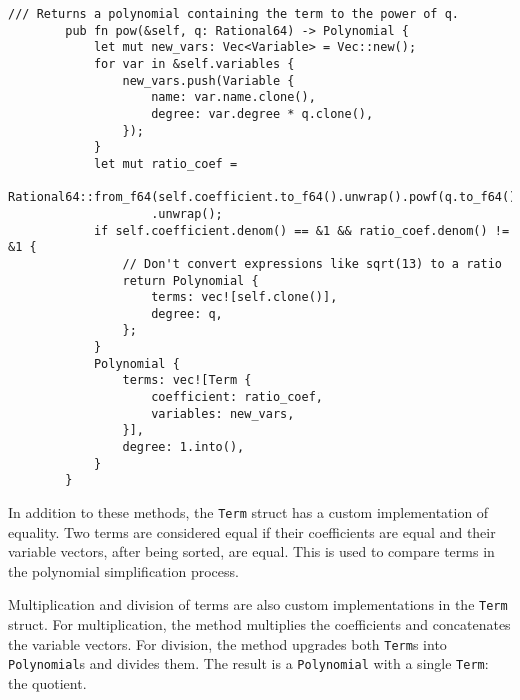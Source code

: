 {    \begin{lstlisting}[caption={The implementation of the \texttt{pow()} method for the \texttt{Term} struct}, label={lst:term-pow}]
        /// Returns a polynomial containing the term to the power of q.
        pub fn pow(&self, q: Rational64) -> Polynomial {
            let mut new_vars: Vec<Variable> = Vec::new();
            for var in &self.variables {
                new_vars.push(Variable {
                    name: var.name.clone(),
                    degree: var.degree * q.clone(),
                });
            }
            let mut ratio_coef =
                Rational64::from_f64(self.coefficient.to_f64().unwrap().powf(q.to_f64().unwrap()))
                    .unwrap();
            if self.coefficient.denom() == &1 && ratio_coef.denom() != &1 {
                // Don't convert expressions like sqrt(13) to a ratio
                return Polynomial {
                    terms: vec![self.clone()],
                    degree: q,
                };
            }
            Polynomial {
                terms: vec![Term {
                    coefficient: ratio_coef,
                    variables: new_vars,
                }],
                degree: 1.into(),
            }
        }
    \end{lstlisting}
}

In addition to these methods, the \verb|Term| struct has a custom implementation of equality. Two terms are considered equal if their coefficients are equal and their variable vectors, after being sorted, are equal. This is used to compare terms in the polynomial simplification process.


Multiplication and division of terms are also custom implementations in the \verb|Term| struct. For multiplication, the method multiplies the coefficients and concatenates the variable vectors. For division, the method upgrades both \verb|Term|s into \verb|Polynomial|s and divides them. The result is a \verb|Polynomial| with a single \verb|Term|: the quotient.

